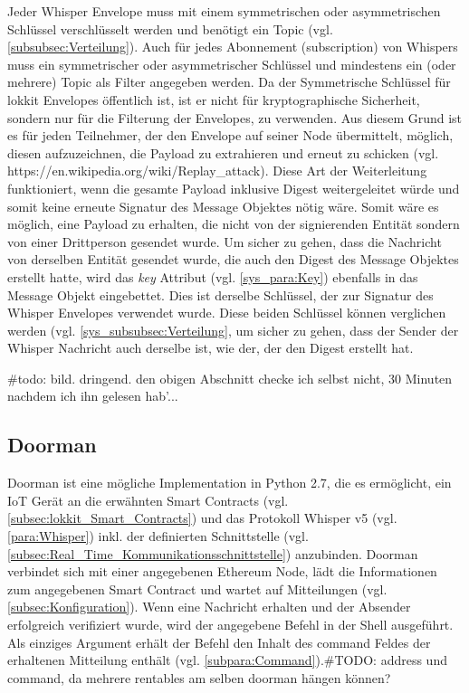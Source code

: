 Jeder Whisper Envelope muss mit einem symmetrischen oder asymmetrischen Schlüssel verschlüsselt werden und benötigt ein Topic (vgl. \ref{subsubsec:Verteilung}).
Auch für jedes Abonnement (subscription) von Whispers muss ein symmetrischer oder asymmetrischer Schlüssel und mindestens ein (oder mehrere) Topic als Filter angegeben werden. Da der Symmetrische Schlüssel für lokkit Envelopes öffentlich ist, ist er nicht für kryptographische Sicherheit, sondern nur für die Filterung der Envelopes, zu verwenden. Aus diesem Grund ist es für jeden Teilnehmer, der den Envelope auf seiner Node übermittelt, möglich, diesen aufzuzeichnen, die Payload zu extrahieren und erneut zu schicken (vgl. https://en.wikipedia.org/wiki/Replay\_attack). Diese Art der Weiterleitung funktioniert, wenn die gesamte Payload inklusive Digest weitergeleitet würde und somit keine erneute Signatur des Message Objektes nötig wäre. Somit wäre es möglich, eine Payload zu erhalten, die nicht von der signierenden Entität sondern von einer Drittperson gesendet wurde. Um sicher zu gehen, dass die Nachricht von derselben Entität gesendet wurde, die auch den Digest des Message Objektes erstellt hatte, wird das \emph{key} Attribut (vgl. \ref{sys_para:Key}) ebenfalls in das Message Objekt eingebettet. Dies ist derselbe Schlüssel, der zur Signatur des Whisper Envelopes verwendet wurde. Diese beiden Schlüssel können verglichen werden (vgl. \ref{sys_subsubsec:Verteilung}, um sicher zu gehen, dass der Sender der Whisper Nachricht auch derselbe ist, wie der, der den Digest erstellt hat.

\#todo: bild. dringend. den obigen Abschnitt checke ich selbst nicht, 30 Minuten nachdem ich ihn gelesen hab'...

\subsection{Doorman}
\label{subsec:Doorman}
Doorman ist eine mögliche Implementation in Python 2.7, die es ermöglicht, ein IoT Gerät an die erwähnten Smart Contracts (vgl. \ref{subsec:lokkit_Smart_Contracts}) und das Protokoll Whisper v5 (vgl. \ref{para:Whisper}) inkl. der definierten Schnittstelle (vgl. \ref{subsec:Real_Time_Kommunikationsschnittstelle}) anzubinden. Doorman verbindet sich mit einer angegebenen Ethereum Node, lädt die Informationen zum angegebenen Smart Contract und wartet auf Mitteilungen (vgl. \ref{subsec:Konfiguration}). Wenn eine Nachricht erhalten und der Absender erfolgreich verifiziert wurde, wird der angegebene Befehl in der Shell ausgeführt. Als einziges Argument erhält der Befehl den Inhalt des command Feldes der erhaltenen Mitteilung enthält (vgl. \ref{subpara:Command}).\#TODO: address und command, da mehrere rentables am selben doorman hängen können?

